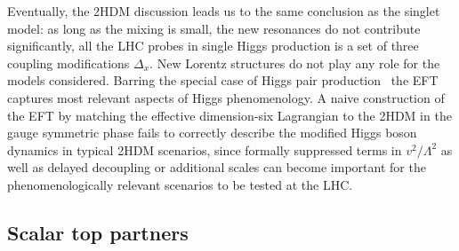 
Eventually, the 2HDM discussion leads us to the same conclusion as the
singlet model: as long as the mixing is small, the new resonances do
not contribute significantly, all the LHC probes in single Higgs
production is a set of three coupling modifications $\Delta_x$. New
Lorentz structures do not play any role for the models
considered. Barring the special case of Higgs pair
production~\cite{Hespel:2014sla,higgspair2hdm} the EFT captures most
relevant aspects of Higgs phenomenology.  A naive construction of the
EFT by matching the effective dimension-six Lagrangian to the 2HDM in
the gauge symmetric phase fails to correctly describe the modified
Higgs boson dynamics in typical 2HDM scenarios, since formally
suppressed terms in $v^2/\Lambda^2$ as well as delayed decoupling or
additional scales can become important for the phenomenologically
relevant scenarios to be tested at the LHC.



\subsection{Scalar top partners}
\label{sec:validity_partners}

